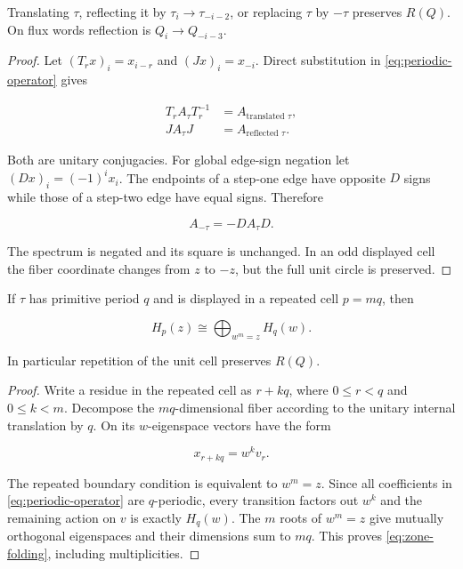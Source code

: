 \begin{lemma}
\label{lem:operator-equivalences}
Translating \(\tau\),
reflecting it by \(\tau_i \to  \tau_{-i-2}\), or replacing \(\tau\) by \(-\tau\) preserves
\(R(Q)\). On flux words reflection is \(Q_i \to  Q_{-i-3}\).

\end{lemma}
\begin{proof}
Let \((T_r x)_i=x_{i-r}\) and \((Jx)_i=x_{-i}\). Direct substitution in
\eqref{eq:periodic-operator} gives

\begin{equation}
\begin{aligned}
T_r A_\tau T_r^{-1}&=A_{\text{translated }\tau}, \\
J A_\tau J&=A_{\text{reflected }\tau}.
\end{aligned}
\end{equation}

Both are unitary conjugacies. For global edge-sign negation let
\((Dx)_i=(-1)^i x_i\). The
endpoints of a step-one edge have opposite \(D\) signs while those of a step-two
edge have equal signs. Therefore

\begin{equation}
A_{-\tau}=-D A_\tau D.
\end{equation}

The spectrum is negated and its square is unchanged. In an odd displayed cell
the fiber coordinate changes from \(z\) to \(-z\), but the full unit circle is
preserved.

\end{proof}
\begin{lemma}
\label{lem:zone-folding}
If \(\tau\) has primitive period \(q\) and is
displayed in a repeated cell \(p=mq\), then

\begin{equation}
\label{eq:zone-folding}
H_p(z) \cong \bigoplus_{w^m=z} H_q(w).
\end{equation}

In particular repetition of the unit cell preserves \(R(Q)\).

\end{lemma}
\begin{proof}
Write a residue in the repeated cell as \(r+kq\), where
\(0\leq r<q\) and \(0\leq k<m\). Decompose the \(mq\)-dimensional fiber according to the
unitary internal translation by \(q\). On its \(w\)-eigenspace vectors have the
form

\begin{equation}
x_{r+kq}=w^k v_r.
\end{equation}

The repeated boundary condition is equivalent to \(w^m=z\). Since all
coefficients in \eqref{eq:periodic-operator} are \(q\)-periodic, every transition factors out \(w^k\)
and the remaining action on \(v\) is exactly \(H_q(w)\). The \(m\) roots of
\(w^m=z\) give mutually orthogonal eigenspaces and their dimensions sum to
\(mq\). This proves \eqref{eq:zone-folding}, including multiplicities.

\end{proof}
